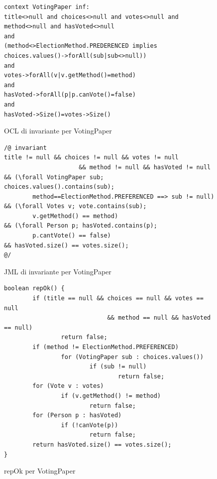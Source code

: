 \begin{figure}
	\centering
	\begin{verbatim}
context VotingPaper inf:
title<>null and choices<>null and votes<>null and method<>null and hasVoted<>null
and
(method<>ElectionMethod.PREDERENCED implies choices.values()->forAll(sub|sub<>null))
and
votes->forAll(v|v.getMethod()=method)
and
hasVoted->forAll(p|p.canVote()=false)
and
hasVoted->Size()=votes->Size()
        \end{verbatim}
	\caption{OCL di invariante per VotingPaper}\label{OCL-VP}
\end{figure}

\begin{figure}
	\centering
	\begin{verbatim}
/@ invariant
title != null && choices != null && votes != null
                     && method != null && hasVoted != null
&& (\forall VotingPaper sub; choices.values().contains(sub);
        method==ElectionMethod.PREFERENCED ==> sub != null)
&& (\forall Votes v; vote.contains(sub);
        v.getMethod() == method)
&& (\forall Person p; hasVoted.contains(p);
        p.cantVote() == false)
&& hasVoted.size() == votes.size();
@/
        \end{verbatim}
	\caption{JML di invariante per VotingPaper}\label{JML-VP}
\end{figure}

\begin{figure}
	\centering
	\begin{verbatim}
boolean repOk() {
        if (title == null && choices == null && votes == null
                             && method == null && hasVoted == null)
                return false;
        if (method != ElectionMethod.PREFERENCED)
                for (VotingPaper sub : choices.values())
                        if (sub != null)
                                return false;
        for (Vote v : votes)
                if (v.getMethod() != method)
                        return false;
        for (Person p : hasVoted)
                if (!canVote(p))
                        return false;
        return hasVoted.size() == votes.size();
}
        \end{verbatim}
	\caption{repOk per VotingPaper}\label{repOk-VP}
\end{figure}




